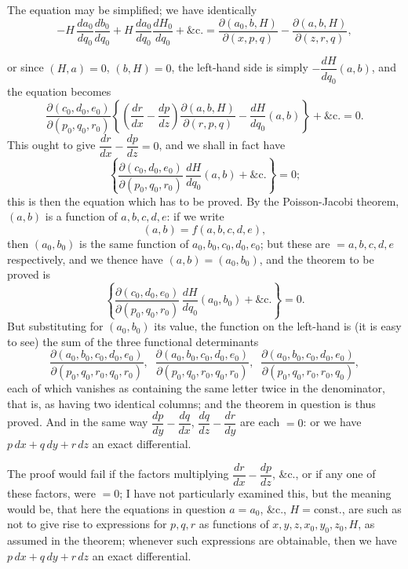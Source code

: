 \documentclass[11pt,a4paper]{article}
\begin{document}
The equation may be simplified; we have identically
\[
- H\,\frac{da_{0}}{dq_{0}}\frac{db_{0}}{dq_{0}} + H\,\frac{da_{0}}{dq_{0}}\frac{dH_{0}}{dq_{0}} + \&\text{c.} = \frac{\partial(a_{0}, b, H)}{\partial(x, p, q)} - \frac{\partial(a, b, H)}{\partial(z, r, q)},
\]

\newpage


or since $(H, a) = 0$, $(b, H) = 0$, the left-hand side is simply $-\dfrac{dH}{dq_{0}}(a, b)$, and the equation becomes
\[
\frac{\partial(c_{0}, d_{0}, e_{0})}{\partial(p_{0}, q_{0}, r_{0})}\!\left\{ \!\left(\frac{dr}{dx} - \frac{dp}{dz}\right)\frac{\partial(a, b, H)}{\partial(r, p, q)} - \frac{dH}{dq_{0}}(a, b) \right\} + \&\text{c.} = 0.
\]
This ought to give $\dfrac{dr}{dx} - \dfrac{dp}{dz} = 0$, and we shall in fact have
\[
\left\{ \frac{\partial(c_{0}, d_{0}, e_{0})}{\partial(p_{0}, q_{0}, r_{0})}\,\frac{dH}{dq_{0}}(a, b) + \&\text{c.} \right\} = 0;
\]
this is then the equation which has to be proved. By the Poisson-Jacobi theorem, $(a, b)$ is a function of $a, b, c, d, e$: if we write
\[
(a, b) = f(a, b, c, d, e),
\]
then $(a_{0}, b_{0})$ is the same function of $a_{0}, b_{0}, c_{0}, d_{0}, e_{0}$; but these are $= a, b, c, d, e$ respectively, and we thence have $(a, b) = (a_{0}, b_{0})$, and the theorem to be proved is
\[
\left\{ \frac{\partial(c_{0}, d_{0}, e_{0})}{\partial(p_{0}, q_{0}, r_{0})}\,\frac{dH}{dq_{0}}(a_{0}, b_{0}) + \&\text{c.} \right\} = 0.
\]
But substituting for $(a_{0}, b_{0})$ its value, the function on the left-hand is (it is easy to see) the sum of the three functional determinants
\[
\frac{\partial(a_{0}, b_{0}, c_{0}, d_{0}, e_{0})}{\partial(p_{0}, q_{0}, r_{0}, q_{0}, r_{0})}, \;\; \frac{\partial(a_{0}, b_{0}, c_{0}, d_{0}, e_{0})}{\partial(p_{0}, q_{0}, r_{0}, q_{0}, r_{0})}, \;\; \frac{\partial(a_{0}, b_{0}, c_{0}, d_{0}, e_{0})}{\partial(p_{0}, q_{0}, r_{0}, r_{0}, q_{0})},
\]
each of which vanishes as containing the same letter twice in the denominator, that is, as having two identical columns; and the theorem in question is thus proved. And in the same way $\dfrac{dp}{dy} - \dfrac{dq}{dx}$, $\dfrac{dq}{dz} - \dfrac{dr}{dy}$ are each $= 0$: or we have $p\,dx + q\,dy + r\,dz$ an exact differential.

The proof would fail if the factors multiplying $\dfrac{dr}{dx} - \dfrac{dp}{dz}$, \&c., or if any one of these factors, were $= 0$; I have not particularly examined this, but the meaning would be, that here the equations in question $a = a_{0}$, \&c., $H = \text{const.}$, are such as not to give rise to expressions for $p, q, r$ as functions of $x, y, z, x_{0}, y_{0}, z_{0}, H$, as assumed in the theorem; whenever such expressions are obtainable, then we have $p\,dx + q\,dy + r\,dz$ an exact differential.
\end{document}
